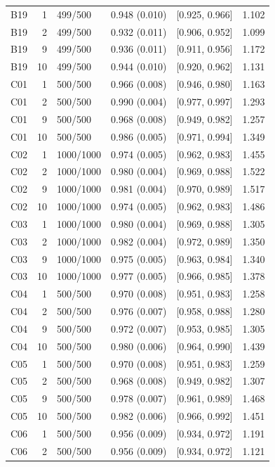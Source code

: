 \begin{longtable}[t]{lrllll}
B19 & 1 & 499/500 & 0.948 (0.010) & {}[0.925, 0.966] & 1.102\\
B19 & 2 & 499/500 & 0.932 (0.011) & {}[0.906, 0.952] & 1.099\\
B19 & 9 & 499/500 & 0.936 (0.011) & {}[0.911, 0.956] & 1.172\\
B19 & 10 & 499/500 & 0.944 (0.010) & {}[0.920, 0.962] & 1.131\\
C01 & 1 & 500/500 & 0.966 (0.008) & {}[0.946, 0.980] & 1.163\\
C01 & 2 & 500/500 & 0.990 (0.004) & {}[0.977, 0.997] & 1.293\\
C01 & 9 & 500/500 & 0.968 (0.008) & {}[0.949, 0.982] & 1.257\\
C01 & 10 & 500/500 & 0.986 (0.005) & {}[0.971, 0.994] & 1.349\\
C02 & 1 & 1000/1000 & 0.974 (0.005) & {}[0.962, 0.983] & 1.455\\
C02 & 2 & 1000/1000 & 0.980 (0.004) & {}[0.969, 0.988] & 1.522\\
C02 & 9 & 1000/1000 & 0.981 (0.004) & {}[0.970, 0.989] & 1.517\\
C02 & 10 & 1000/1000 & 0.974 (0.005) & {}[0.962, 0.983] & 1.486\\
C03 & 1 & 1000/1000 & 0.980 (0.004) & {}[0.969, 0.988] & 1.305\\
C03 & 2 & 1000/1000 & 0.982 (0.004) & {}[0.972, 0.989] & 1.350\\
C03 & 9 & 1000/1000 & 0.975 (0.005) & {}[0.963, 0.984] & 1.340\\
C03 & 10 & 1000/1000 & 0.977 (0.005) & {}[0.966, 0.985] & 1.378\\
C04 & 1 & 500/500 & 0.970 (0.008) & {}[0.951, 0.983] & 1.258\\
C04 & 2 & 500/500 & 0.976 (0.007) & {}[0.958, 0.988] & 1.280\\
C04 & 9 & 500/500 & 0.972 (0.007) & {}[0.953, 0.985] & 1.305\\
C04 & 10 & 500/500 & 0.980 (0.006) & {}[0.964, 0.990] & 1.439\\
C05 & 1 & 500/500 & 0.970 (0.008) & {}[0.951, 0.983] & 1.259\\
C05 & 2 & 500/500 & 0.968 (0.008) & {}[0.949, 0.982] & 1.307\\
C05 & 9 & 500/500 & 0.978 (0.007) & {}[0.961, 0.989] & 1.468\\
C05 & 10 & 500/500 & 0.982 (0.006) & {}[0.966, 0.992] & 1.451\\
C06 & 1 & 500/500 & 0.956 (0.009) & {}[0.934, 0.972] & 1.191\\
C06 & 2 & 500/500 & 0.956 (0.009) & {}[0.934, 0.972] & 1.121\\

\end{longtable}

